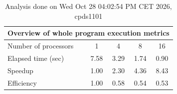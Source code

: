 \begin{table}[h]
\begin{center}
\begin{tabular}{|l|c|c|c|c|}
\hline
\multicolumn{5}{|c|}{Overview of whole program execution metrics} \\
\hline
\hline
Number of processors & 1 & 4 & 8 & 16 \\
\hline
Elapsed time (sec)      &       7.58 &       3.29 &       1.74 &       0.90 \\
\hline
Speedup                 &       1.00 &       2.30 &       4.36 &       8.43 \\
\hline
Efficiency              &       1.00 &       0.58 &       0.54 &       0.53 \\
\hline
\end{tabular}
\end{center}
\caption{ Analysis done on Wed Oct 28 04:02:54 PM CET 2026, cpds1101}
\end{table}
